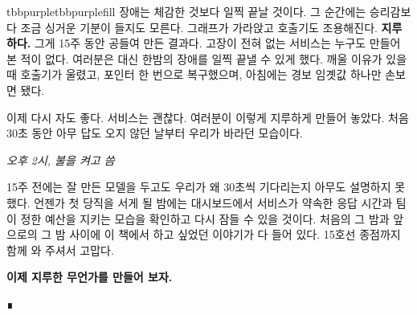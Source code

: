 \begin{calloutbox}{tbbpurple}{tbbpurplefill}
장애는 체감한 것보다 일찍 끝날 것이다. 그 순간에는 승리감보다 조금 싱거운 기분이 들지도 모른다. 그래프가 가라앉고 호출기도 조용해진다. \textbf{지루하다.} 그게 15주 동안 공들여 만든 결과다. 고장이 전혀 없는 서비스는 누구도 만들어 본 적이 없다. 여러분은 대신 한밤의 장애를 일찍 끝낼 수 있게 했다. 깨울 이유가 있을 때 호출기가 울렸고, 포인터 한 번으로 복구했으며, 아침에는 경보 임곗값 하나만 손보면 됐다.

이제 다시 자도 좋다. 서비스는 괜찮다. 여러분이 이렇게 지루하게 만들어 놓았다. 처음 30초 동안 아무 답도 오지 않던 날부터 우리가 바라던 모습이다.

{\raggedleft \textcolor{tbbgray}{\textit{오후 2시, 불을 켜고 씀}}\par}
\end{calloutbox}

\vspace{4.0pt}

15주 전에는 잘 만든 모델을 두고도 우리가 왜 30초씩 기다리는지 아무도 설명하지 못했다. 언젠가 첫 당직을 서게 될 밤에는 대시보드에서 서비스가 약속한 응답 시간과 팀이 정한 예산을 지키는 모습을 확인하고 다시 잠들 수 있을 것이다. 처음의 그 밤과 앞으로의 그 밤 사이에 이 책에서 하고 싶었던 이야기가 다 들어 있다. 15호선 종점까지 함께 와 주셔서 고맙다.

\begin{center}
{\large \textcolor{tbbink}{\textbf{이제 지루한 무언가를 만들어 보자.}}}
\end{center}

\begin{center}
\textcolor{tbbgray}{∎}
\end{center}
